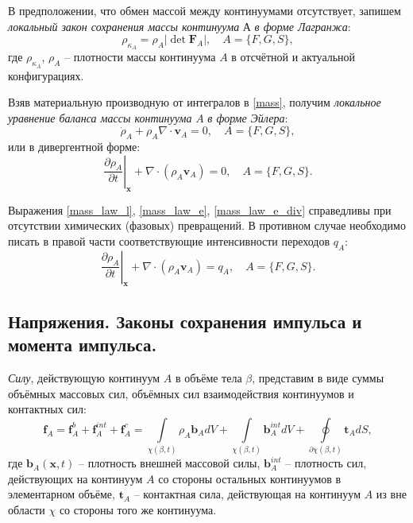 	В предположении, что обмен массой между континуумами отсутствует, запишем \textit{локальный закон сохранения массы континуума} $А$ \textit{в форме Лагранжа}:
\begin{equation}
	\label{mass_law_l}
	\rho_{\kappa_A} = \rho_A \left|\det \boldsymbol{F}_A\right|, \quad A=\{F, G, S\},
\end{equation}
	где $\rho_{\kappa_A}$, $\rho_A$ -- плотности массы континуума $A$ в отсчётной и актуальной конфигурациях.
	
	Взяв материальную производную от интегралов в \eqref{mass}, получим \textit{локальное уравнение баланса массы континуума} $A$ \textit{в форме Эйлера}:
\begin{equation}
	\label{mass_law_e}
	\dot{\rho}_A + \rho_A \nabla \cdot \boldsymbol{v}_A = 0, \quad A=\{F, G, S\},
\end{equation}
	или в дивергентной форме:
\begin{equation}
	\label{mass_law_e_div}
	\left.\frac{\partial \rho_A}{\partial t}\right|_{\boldsymbol{x}} + \nabla \cdot \left(\rho_A \boldsymbol{v}_A\right) = 0, \quad A=\{F, G, S\}.
\end{equation}
	
	Выражения \eqref{mass_law_l}, \eqref{mass_law_e}, \eqref{mass_law_e_div} справедливы при отсутствии химических (фазовых) превращений. В противном случае необходимо писать в правой части соответствующие интенсивности переходов $q_A$:
\begin{equation}
	\label{mass_law_e_div1}
	\left.\frac{\partial \rho_A}{\partial t}\right|_{\boldsymbol{x}} + \nabla \cdot \left(\rho_A \boldsymbol{v}_A\right) = q_A, \quad A=\{F, G, S\}.
\end{equation}

\subsection{Напряжения. Законы сохранения импульса и момента импульса.}
	\textit{Силу}, действующую континуум $A$ в объёме тела $\beta$, представим в виде суммы объёмных массовых сил, объёмных сил взаимодействия континуумов и контактных сил:
\begin{equation}
	\label{force_A}
	\boldsymbol{f}_A = \boldsymbol{f}_A^b + \boldsymbol{f}_A^{int} + \boldsymbol{f}_A^c = \int\limits_{\chi({\beta}, t)}\rho_A \boldsymbol{b}_A dV + \int\limits_{\chi({\beta}, t)}\boldsymbol{b}_A^{int} dV + \oint\limits_{\partial\chi({\beta}, t)}\boldsymbol{t}_A dS,
\end{equation}
	где $\boldsymbol{b}_A(\boldsymbol{x}, t)$ -- плотность внешней массовой силы,
	$\boldsymbol{b}_A^{int}$ -- плотность сил, действующих на континуум $A$ со стороны остальных континуумов в элементарном объёме,
	$\boldsymbol{t}_A$ -- контактная сила, действующая на континуум $A$ из вне области $\chi$ со стороны того же континуума.

